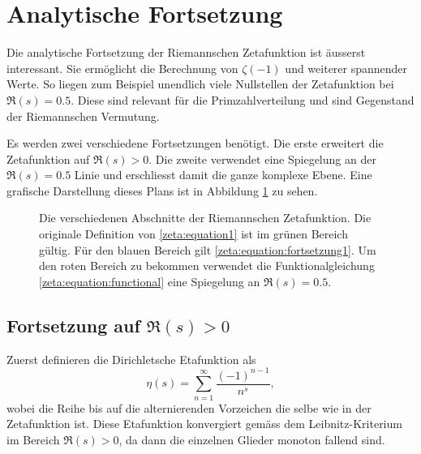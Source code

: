 \section{Analytische Fortsetzung} \label{zeta:section:analytische_fortsetzung}

Die analytische Fortsetzung der Riemannschen Zetafunktion ist äusserst interessant.
Sie ermöglicht die Berechnung von $\zeta(-1)$ und weiterer spannender Werte.
So liegen zum Beispiel unendlich viele Nullstellen der Zetafunktion bei $\Re(s) = 0.5$.
Diese sind relevant für die Primzahlverteilung und sind Gegenstand der Riemannschen Vermutung.

Es werden zwei verschiedene Fortsetzungen benötigt.
Die erste erweitert die Zetafunktion auf $\Re(s) > 0$.
Die zweite verwendet eine Spiegelung an der $\Re(s) = 0.5$ Linie und erschliesst damit die ganze komplexe Ebene.
Eine grafische Darstellung dieses Plans ist in Abbildung \ref{zeta:fig:continuation_overview} zu sehen.
\begin{figure}
    \centering
    
    \caption{
        Die verschiedenen Abschnitte der Riemannschen Zetafunktion.
        Die originale Definition von \eqref{zeta:equation1} ist im grünen Bereich gültig.
        Für den blauen Bereich gilt \eqref{zeta:equation:fortsetzung1}.
        Um den roten Bereich zu bekommen verwendet die Funktionalgleichung \eqref{zeta:equation:functional} eine Spiegelung an $\Re(s) = 0.5$.
    }
    \label{zeta:fig:continuation_overview}
\end{figure}

\subsection{Fortsetzung auf $\Re(s) > 0$} \label{zeta:subsection:auf_bereich_ge_0}
Zuerst definieren die Dirichletsche Etafunktion als
\begin{equation}\label{zeta:equation:eta}
    \eta(s)
    =
    \sum_{n=1}^{\infty}
    \frac{(-1)^{n-1}}{n^s},
\end{equation}
wobei die Reihe bis auf die alternierenden Vorzeichen die selbe wie in der Zetafunktion ist.
Diese Etafunktion konvergiert gemäss dem Leibnitz-Kriterium im Bereich $\Re(s) > 0$, da dann die einzelnen Glieder monoton fallend sind.

